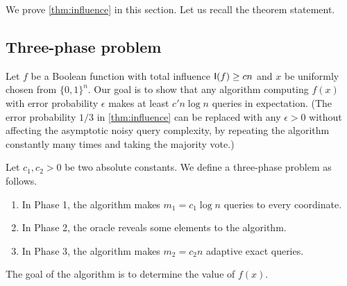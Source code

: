 We prove \cref{thm:influence} in this section. Let us recall the theorem statement.

\LinearTotalInfluence*


\subsection{Three-phase problem}
Let $f$ be a Boolean function with total influence $\operatorname{\mathsf{I}}(f) \ge cn$ and $x$ be uniformly chosen from $\{0,1\}^n$.
Our goal is to show that any algorithm computing $f(x)$ with error probability $\epsilon$ makes at least $c'n\log n$ queries in expectation.
(The error probability $1/3$ in  \cref{thm:influence} can be replaced with any $\epsilon > 0$ without affecting the asymptotic noisy query complexity, by repeating the algorithm constantly many times and taking the majority vote.)

Let $c_1,c_2>0$ be two absolute constants. We define a three-phase problem as follows.
\begin{enumerate}
  \item In Phase 1, the algorithm makes $m_1 = c_1 \log n$ queries to every coordinate.
  \item In Phase 2, the oracle reveals some elements to the algorithm.
  \item In Phase 3, the algorithm makes $m_2 = c_2 n$ adaptive exact queries.
\end{enumerate}
The goal of the algorithm is to determine the value of $f(x)$.


